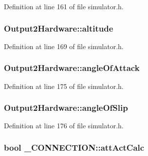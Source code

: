 Definition at line 161 of file simulator.\-h.

\hypertarget{group___h_i_t_l_plugin_gafbb52a0b15f16cac6f1efbcae3702e96}{
\subsubsection[{altitude}]{ Output2\-Hardware\-::altitude}}\label{group___h_i_t_l_plugin_gafbb52a0b15f16cac6f1efbcae3702e96}


Definition at line 169 of file simulator.\-h.

\hypertarget{group___h_i_t_l_plugin_gaa698baa5c5eb08252558e7821e3d48dd}{
\subsubsection[{angle\-Of\-Attack}]{ Output2\-Hardware\-::angle\-Of\-Attack}}\label{group___h_i_t_l_plugin_gaa698baa5c5eb08252558e7821e3d48dd}


Definition at line 175 of file simulator.\-h.

\hypertarget{group___h_i_t_l_plugin_ga03a3c3371749ca83551e6f29e804a205}{
\subsubsection[{angle\-Of\-Slip}]{ Output2\-Hardware\-::angle\-Of\-Slip}}\label{group___h_i_t_l_plugin_ga03a3c3371749ca83551e6f29e804a205}


Definition at line 176 of file simulator.\-h.

\hypertarget{group___h_i_t_l_plugin_gab40adc150ae79f115f2680cdf131b41d}{
\subsubsection[{att\-Act\-Calc}]{\setlength{\rightskip}{0pt plus 5cm}bool \-\_\-\-C\-O\-N\-N\-E\-C\-T\-I\-O\-N\-::att\-Act\-Calc}}\label{group___h_i_t_l_plugin_gab40adc150ae79f115f2680cdf131b41d}


